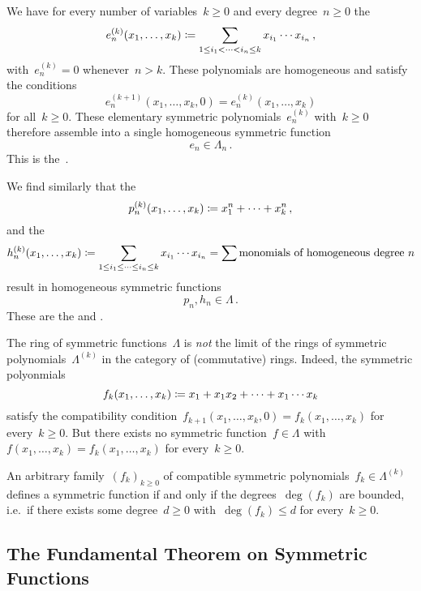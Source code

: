 \documentclass[a4paper,11pt]{scrartcl}
\begin{document}
\begin{example}
  We have for every number of variables~$k \geq 0$ and every degree~$n \geq 0$ the 
  \[
    e^{(k)}_n(x_1, \dotsc, x_k)
    \coloneqq
    \sum_{1 \leq i_1 < \dotsb < i_n \leq k}
    x_{i_1} \dotsm x_{i_n} \,,
  \]
  with~$e^{(k)}_n = 0$ whenever~$n > k$.
  These polynomials are homogeneous and satisfy the conditions
  \[
    e^{(k+1)}_n(x_1, \dotsc, x_k, 0)
    =
    e^{(k)}_n(x_1, \dotsc, x_k)
  \]
  for all~$k \geq 0$.
  These elementary symmetric polynomials~$e^{(k)}_n$ with~$k \geq 0$ therefore assemble into a single homogeneous symmetric function
  \[
    e_n \in \Lambda_n \,.
  \]
  This is the~. 

  We find similarly that the 
  \[
    p^{(k)}_n(x_1, \dotsc, x_k)
    \coloneqq
    x_1^n + \dotsb + x_k^n \,,
  \]
  and the 
  \[
    h^{(k)}_n(x_1, \dotsc, x_k)
    \coloneqq
    \sum_{1 \leq i_1 \leq \dotsb \leq i_n \leq k}
    x_{i_1} \dotsm x_{i_n}
    =
    \sum \text{monomials of homogeneous degree~$n$}
  \]
  result in homogeneous symmetric functions
  \[
    p_n, h_n \in \Lambda \,.
  \]
  These are the  and .
\end{example}


\begin{warning}
  The ring of symmetric functions~$\Lambda$ is \emph{not} the limit of the rings of symmetric polynomials~$\Lambda^{(k)}$ in the category of (commutative) rings.
  Indeed, the symmetric polyonmials
  \[
    f_k(x_1, \dotsc, x_k)
    \coloneqq
    x_1 + x_1 x_2 + \dotsb + x_1 \dotsm x_k
  \]
  satisfy the compatibility condition~$f_{k+1}(x_1, \dotsc, x_k, 0) = f_k(x_1, \dotsc, x_k)$ for every~$k \geq 0$.
  But there exists no symmetric function~$f \in \Lambda$ with~$f(x_1, \dotsc, x_k) = f_k(x_1, \dotsc, x_k)$ for every~$k \geq 0$.

  An arbitrary family~$(f_k)_{k \geq 0}$ of compatible symmetric polynomials~$f_k \in \Lambda^{(k)}$ defines a symmetric function if and only if the degrees~$\deg(f_k)$ are bounded, i.e.\ if there exists some degree~$d \geq 0$ with~$\deg(f_k) \leq d$ for every~$k \geq 0$.
\end{warning}



\subsection{The Fundamental Theorem on Symmetric Functions}
\end{document}
